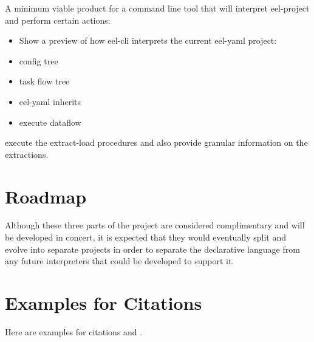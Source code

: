 A minimum viable product for a command line tool that will interpret
eel-project and perform certain actions:

\begin{itemize}
\item
  Show a preview of how eel-cli interprets the current eel-yaml project:
\item
  config tree
\item
  task flow tree
\item
  eel-yaml inherits
\item
  execute dataflow
\end{itemize}

execute the extract-load procedures and also provide granular
information on the extractions.

\chapter{Roadmap}\label{roadmap}

Although these three parts of the project are considered complimentary
and will be developed in concert, it is expected that they would
eventually split and evolve into separate projects in order to separate
the declarative language from any future interpreters that could be
developed to support it.

\chapter{Examples for Citations}\label{examples-for-citations}

Here are examples for citations \citep{P2} and \citep{P2}.
